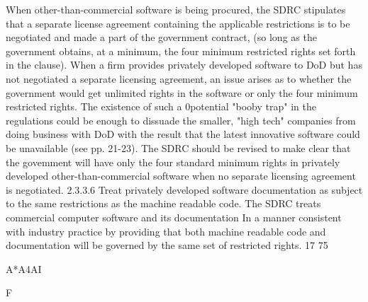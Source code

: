 \documentclass[12pt]{article}
\begin{document}
When other-than-commercial software is being procured, the SDRC stipulates that a separate license
agreement containing the applicable restrictions is to be negotiated and made a part of the government contract, (so long as the government obtains, at a minimum, the four minimum restricted rights
set forth in the clause). When a firm provides privately developed software to DoD but has not
negotiated a separate licensing agreement, an issue arises as to whether the government would get
unlimited rights in the software or only the four minimum restricted rights. The existence of such a
0potential "booby trap" in the regulations could be enough to dissuade the smaller, "high tech" companies from doing business with DoD with the result that the latest innovative software could be unavailable (see pp. 21-23). The SDRC should be revised to make clear that the govemment will have only
the four standard minimum rights in privately developed other-than-commercial software when no
separate licensing agreement is negotiated.
2.3.3.6 Treat privately developed software documentation as subject to the same restrictions
as the machine readable code.
The SDRC treats commercial computer software and its documentation In a manner consistent with
industry practice by providing that both machine readable code and documentation will be governed
by the same set of restricted rights.
17
75

A*A4AI

F

\end{document}
